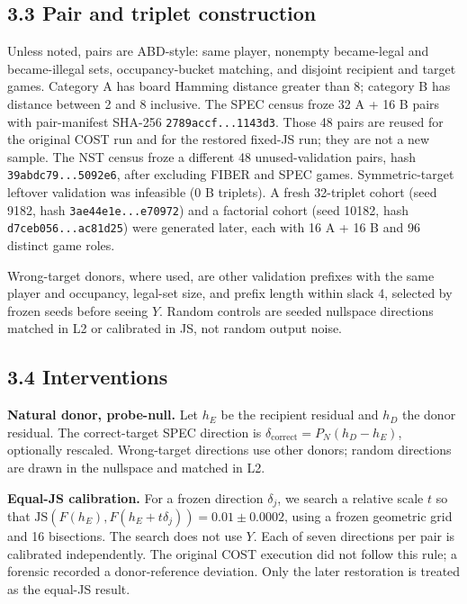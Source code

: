 \documentclass[11pt]{article}
\begin{document}
\subsection{3.3 Pair and triplet construction}

Unless noted, pairs are ABD-style: same player, nonempty became-legal and became-illegal sets, occupancy-bucket matching, and disjoint recipient and target games. Category A has board Hamming distance greater than 8; category B has distance between 2 and 8 inclusive. The SPEC census froze 32 A + 16 B pairs with pair-manifest SHA-256 \texttt{2789accf...1143d3}. Those 48 pairs are reused for the original COST run and for the restored fixed-JS run; they are not a new sample. The NST census froze a different 48 unused-validation pairs, hash \texttt{39abdc79...5092e6}, after excluding FIBER and SPEC games. Symmetric-target leftover validation was infeasible (0 B triplets). A fresh 32-triplet cohort (seed 9182, hash \texttt{3ae44e1e...e70972}) and a factorial cohort (seed 10182, hash \texttt{d7ceb056...ac81d25}) were generated later, each with 16 A + 16 B and 96 distinct game roles.

Wrong-target donors, where used, are other validation prefixes with the same player and occupancy, legal-set size, and prefix length within slack 4, selected by frozen seeds before seeing \(Y\). Random controls are seeded nullspace directions matched in L2 or calibrated in JS, not random output noise.

\subsection{3.4 Interventions}

\textbf{Natural donor, probe-null.} Let \(h_E\) be the recipient residual and \(h_D\) the donor residual. The correct-target SPEC direction is \(\delta_{\mathrm{correct}}=P_N(h_D-h_E)\), optionally rescaled. Wrong-target directions use other donors; random directions are drawn in the nullspace and matched in L2.

\textbf{Equal-JS calibration.} For a frozen direction \(\delta_j\), we search a relative scale \(t\) so that \(\mathrm{JS}(F(h_E),F(h_E+t\delta_j))=0.01\pm 0.0002\), using a frozen geometric grid and 16 bisections. The search does not use \(Y\). Each of seven directions per pair is calibrated independently. The original COST execution did not follow this rule; a forensic recorded a donor-reference deviation. Only the later restoration is treated as the equal-JS result.
\end{document}
